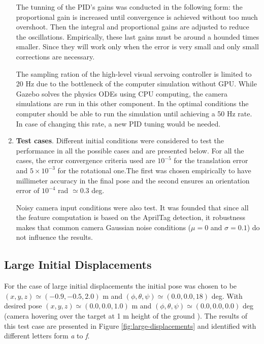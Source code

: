 \begin{enumerate}
	The tunning of the PID's gains was conducted in the following form: the proportional gain is increased until convergence is achieved without too much overshoot. Then the integral and proportional gains are adjusted to reduce the oscillations. Empirically, these last gains must be around a hounded times smaller. Since they will work only when the error is very small and only small corrections are necessary.
	
	The sampling ration of the high-level visual servoing controller is limited to 20 Hz due to the bottleneck of the computer simulation without GPU. While Gazebo solves the physics ODEs using CPU computing, the camera simulations are run in this other component. In the optimal conditions the computer should be able to run the simulation until achieving a 50 Hz rate. In case of changing this rate, a new PID tuning would be needed.
	
	
	\item \textbf{Test cases}. Different initial conditions were considered to test the performance in all the possible cases and are presented below. For all the cases, the error convergence criteria used are $10^{-5}$ for the translation error and $5\times 10^{-3}$ for the rotational one.The first was chosen empirically to have millimeter accuracy in the final pose and the second ensures an orientation error of $10^{-4}$ rad $\simeq 0.3$ deg.
	
	Noisy camera input conditions were also test. It was founded that since all the feature computation is based on the AprilTag detection, it robustness makes that common camera Gaussian noise conditions ($\mu = 0$ and $\sigma = 0.1$) do not influence the results.
\end{enumerate}

\subsection{Large Initial Displacements}
\label{sec:large-initial-displacements}

For the case of large initial displacements the initial pose was chosen to be $(x, y, z) \simeq (-0.9, -0.5, 2.0)$ m and $(\phi, \theta, \psi) \simeq (0.0, 0.0, 18)$ deg. With desired pose $(x, y, z) \simeq (0.0, 0.0, 1.0)$ m and $(\phi, \theta, \psi) \simeq (0.0, 0.0, 0.0)$ deg (camera hovering over the target at 1 m height of the ground ). The results of this test case are presented in Figure \ref{fig:large-displacements} and identified with different letters form \emph{a} to \emph{f}.

